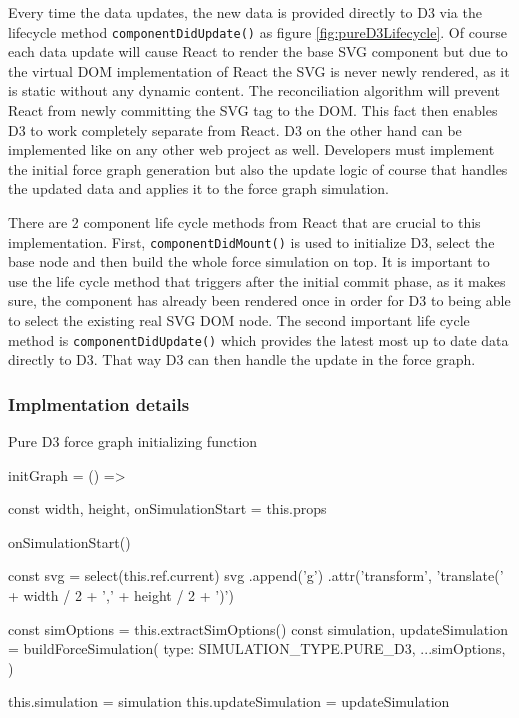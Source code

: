 Every time the data updates, the new data is provided directly to D3 via the lifecycle method \texttt{componentDidUpdate()} as figure \ref{fig:pureD3Lifecycle}. Of course each data update will cause React to render the base SVG component but due to the virtual DOM implementation of React the SVG is never newly rendered, as it is static without any dynamic content. The reconciliation algorithm will prevent React from newly committing the SVG tag to the DOM. This fact then enables D3 to work completely separate from React. D3 on the other hand can be implemented like on any other web project as well. Developers must implement the initial force graph generation but also the update logic of course that handles the updated data and applies it to the force graph simulation.

There are 2 component life cycle methods from React that are crucial to this implementation. First, \texttt{componentDidMount()} is used to initialize D3, select the base node and then build the whole force simulation on top. It is important to use the life cycle method that triggers after the initial commit phase, as it makes sure, the component has already been rendered once in order for D3 to being able to select the existing real SVG DOM node. The second important life cycle method is \texttt{componentDidUpdate()} which provides the latest most up to date data directly to D3. That way D3 can then handle the update in the force graph.

\subsubsection{Implmentation details}

\begin{program}
\caption{Pure D3 force graph initializing function}
\label{prog:pureD3InitFn}
\begin{JsCode}
initGraph = () => {
  const { width, height, onSimulationStart } = this.props

  onSimulationStart()

  const svg = select(this.ref.current)
  svg
    .append('g')
    .attr('transform', 'translate(' + width / 2 + ',' + height / 2 + ')')

  const simOptions = this.extractSimOptions()
  const { simulation, updateSimulation } = buildForceSimulation({
    type: SIMULATION_TYPE.PURE_D3,
    ...simOptions,
  })

  this.simulation = simulation
  this.updateSimulation = updateSimulation
}
\end{JsCode}
\end{program}

